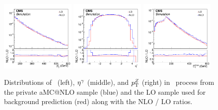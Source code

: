 \begin{figure}[htbp]
  \centering
  \includegraphics[width=0.32\textwidth]{Analysis/Figures/kfactor/ZG_ptg.pdf}
  \includegraphics[width=0.32\textwidth]{Analysis/Figures/kfactor/ZG_etag.pdf}
  \includegraphics[width=0.32\textwidth]{Analysis/Figures/kfactor/ZG_met.pdf}
  \caption{
    Distributions of \ETg\ (left), $\eta^{\gamma}$ (middle), and $p_{\mathrm{T}}^{{Z}}$ (right) in \zinvg\ process from the private aMC@NLO sample (blue) and the LO sample used for background prediction (red) along with the NLO / LO ratios.
  }
  \label{fig:zg_nlo_lo}
\end{figure}

